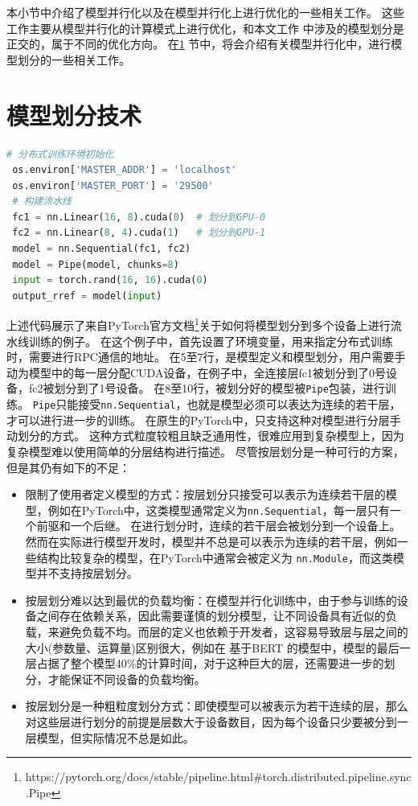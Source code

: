 本小节中介绍了模型并行化以及在模型并行化上进行优化的一些相关工作。
这些工作主要从模型并行化的计算模式上进行优化，和本文工作\sys{} 中涉及的模型划分是正交的，属于不同的优化方向。
在\ref{sec:partition} 节中，将会介绍有关模型并行化中，进行模型划分的一些相关工作。


\section{模型划分技术}
\label{sec:partition}

\begin{lstlisting}[language=Python, caption={PyTorch 1.13中的流水线并行化}]
 # 分布式训练环境初始化
 os.environ['MASTER_ADDR'] = 'localhost'
 os.environ['MASTER_PORT'] = '29500'
 # 构建流水线
 fc1 = nn.Linear(16, 8).cuda(0)  # 划分到GPU-0
 fc2 = nn.Linear(8, 4).cuda(1)   # 划分到GPU-1
 model = nn.Sequential(fc1, fc2)
 model = Pipe(model, chunks=8)
 input = torch.rand(16, 16).cuda(0)
 output_rref = model(input)
\end{lstlisting}


上述代码展示了来自PyTorch官方文档\footnote[1]{https://pytorch.org/docs/stable/pipeline.html\#torch.distributed.pipeline.sync.Pipe}关于如何将模型划分到多个设备上进行流水线训练的例子。
在这个例子中，首先设置了环境变量，用来指定分布式训练时，需要进行RPC通信的地址。
在5至7行，是模型定义和模型划分，用户需要手动为模型中的每一层分配CUDA设备，在例子中，全连接层fc1被划分到了0号设备，fc2被划分到了1号设备。
在8至10行，被划分好的模型被\texttt{Pipe}包装，进行训练。
\texttt{Pipe}只能接受\texttt{nn.Sequential}，也就是模型必须可以表达为连续的若干层，才可以进行进一步的训练。
在原生的PyTorch中，只支持这种对模型进行分层手动划分的方式。
这种方式粒度较粗且缺乏通用性，很难应用到复杂模型上，因为复杂模型难以使用简单的分层结构进行描述。
尽管按层划分是一种可行的方案，但是其仍有如下的不足：
\begin{itemize}
	\item 限制了使用者定义模型的方式：按层划分只接受可以表示为连续若干层的模型，例如在PyTorch中，这类模型通常定义为\texttt{nn.Sequential}，每一层只有一个前驱和一个后继。
	在进行划分时，连续的若干层会被划分到一个设备上。
	然而在实际进行模型开发时，模型并不总是可以表示为连续的若干层，例如一些结构比较复杂的模型，在PyTorch中通常会被定义为 \texttt{nn.Module}，而这类模型并不支持按层划分。
	\item 按层划分难以达到最优的负载均衡：在模型并行化训练中，由于参与训练的设备之间存在依赖关系，因此需要谨慎的划分模型，让不同设备具有近似的负载，来避免负载不均。而层的定义也依赖于开发者，这容易导致层与层之间的大小(参数量、运算量)区别很大，例如在 基于BERT  的模型中，模型的最后一层占据了整个模型40\%的计算时间，对于这种巨大的层，还需要进一步的划分，才能保证不同设备的负载均衡。
	\item 按层划分是一种粗粒度划分方式：即使模型可以被表示为若干连续的层，那么对这些层进行划分的前提是层数大于设备数目，因为每个设备只少要被分到一层模型，但实际情况不总是如此。
\end{itemize}

